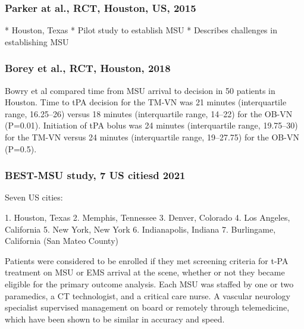 \subsubsection{Parker at al., RCT, Houston, US, 2015 \cite{parker_establishing_2015}}

\begin{markdown}
* Houston, Texas
* Pilot study to establish MSU
* Describes challenges in establishing MSU
\end{markdown}

\subsubsection{Borey et al., RCT, Houston, 2018 \cite{bowry_time_2018}}

Bowry et al \cite{bowry_time_2018} compared time from MSU arrival to decision in 50 patients in Houston. Time to tPA decision for the TM-VN was 21 minutes (interquartile range, 16.25–26) versus 18 minutes (interquartile range, 14–22) for the OB-VN (P=0.01). Initiation of tPA bolus was 24 minutes (interquartile range, 19.75–30) for the TM-VN versus 24 minutes (interquartile range, 19–27.75) for the OB-VN (P=0.5).

\subsubsection{BEST-MSU study, 7 US citiesd 2021 \cite{grotta_prospective_2021}}

Seven US cities:

1. Houston, Texas
2. Memphis, Tennessee  
3. Denver, Colorado
4. Los Angeles, California
5. New York, New York
6. Indianapolis, Indiana
7. Burlingame, California (San Mateo County)

Patients were considered to be enrolled if they met screening criteria for t-PA treatment on MSU or EMS arrival at the scene, whether or not they became eligible for the primary outcome analysis. Each MSU was staffed by one or two paramedics, a CT technologist, and a critical care nurse. A vascular neurology specialist supervised management on board or remotely through telemedicine, which have been shown to be similar in accuracy and speed.


